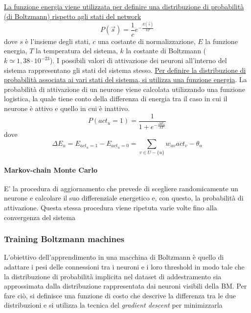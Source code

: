 \uline{La funzione energia viene utilizzata per definire una distribuzione di probabilità (di Boltzmann) rispetto agli stati del network}
$$P(\overrightarrow{s}) = \frac{1}{c} e^{-\frac{E(\overrightarrow{s})}{kT}}$$
dove $s$ è l'insieme degli stati, $c$ una costante di normalizzazione, $E$ la funzione energia, $T$ la temperatura del sistema, $k$ la costante di Boltzmann ($k \simeq 1,38 \cdot 10^{-23}$).
I possibili valori di attivazione dei neuroni all'interno del sistema rappresentano gli stati del sistema stesso. \uline{Per definire la distribuzione di probabilità associata ai vari stati del sistema, si utilizza una funzione energia}. La probabilità di attivazione di un neurone viene calcolata utilizzando una funzione logistica, la quale tiene conto della differenza di energia tra il caso in cui il neurone è attivo e quello in cui è inattivo.
$$P(act_u = 1) = \frac{1}{1 + e^{-\frac{\Delta E_u}{kT}}}$$
dove 
$$\Delta E_u = E_{act_u = 1} - E_{act_u = 0} = \sum_{v \in U - \{u\}} w_{uv} act_v - \theta_u$$

\paragraph{Markov-chain Monte Carlo}
E' la procedura di aggiornamento che prevede di scegliere randomicamente un neurone e calcolare il suo differenziale energetico e, con questo, la probabilità di attivazione. Questa stessa procedura viene ripetuta varie volte fino alla convergenza del sistema

\subsubsection{Training Boltzmann machines}
L'obiettivo dell'apprendimento in una macchina di Boltzmann è quello di adattare i pesi delle connessioni tra i neuroni e i loro threshold in modo tale che la distribuzione di probabilità implicita nel dataset di addestramento sia approssimata dalla distribuzione rappresentata dai neuroni visibili della BM. Per fare ciò, si definisce una funzione di costo che descrive la differenza tra le due distribuzioni e si utilizza la tecnica del \textit{gradient descent} per minimizzarla

